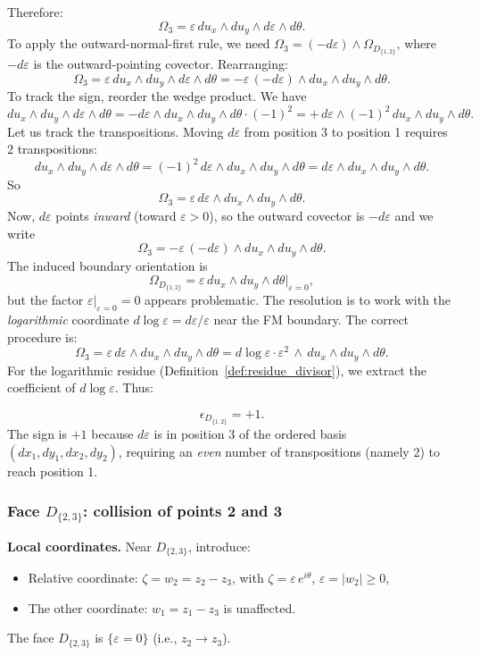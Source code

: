 Therefore:
\[
\Omega_3 = \varepsilon\, du_x\wedge du_y\wedge d\varepsilon\wedge d\theta.
\]
To apply the outward-normal-first rule, we need $\Omega_3 = (-d\varepsilon)\wedge\Omega_{D_{\{1,2\}}}$, where $-d\varepsilon$ is the outward-pointing covector. Rearranging:
\[
\Omega_3 = \varepsilon\,du_x\wedge du_y\wedge d\varepsilon\wedge d\theta = -\varepsilon\,(-d\varepsilon)\wedge du_x\wedge du_y\wedge d\theta.
\]
To track the sign, reorder the wedge product. We have
\[
du_x\wedge du_y\wedge d\varepsilon\wedge d\theta = -d\varepsilon\wedge du_x\wedge du_y\wedge d\theta \cdot (-1)^2 = +\,d\varepsilon\wedge (-1)^2\, du_x\wedge du_y\wedge d\theta.
\]
Let us track the transpositions. Moving $d\varepsilon$ from position 3 to position 1 requires 2 transpositions:
\[
du_x\wedge du_y \wedge d\varepsilon\wedge d\theta = (-1)^2\,d\varepsilon\wedge du_x\wedge du_y\wedge d\theta = d\varepsilon\wedge du_x\wedge du_y\wedge d\theta.
\]
So
\[
\Omega_3 = \varepsilon\,d\varepsilon\wedge du_x\wedge du_y\wedge d\theta.
\]
Now, $d\varepsilon$ points \emph{inward} (toward $\varepsilon > 0$), so the outward covector is $-d\varepsilon$ and we write
\[
\Omega_3 = -\varepsilon\,(-d\varepsilon)\wedge du_x\wedge du_y\wedge d\theta.
\]
The induced boundary orientation is
\[
\Omega_{D_{\{1,2\}}} = \varepsilon\,du_x\wedge du_y\wedge d\theta\Big|_{\varepsilon=0},
\]
but the factor $\varepsilon|_{\varepsilon=0} = 0$ appears problematic. The resolution is to work with the \emph{logarithmic} coordinate $d\log\varepsilon = d\varepsilon/\varepsilon$ near the FM boundary. The correct procedure is:
\[
\Omega_3 = \varepsilon\,d\varepsilon\wedge du_x\wedge du_y\wedge d\theta = d\log\varepsilon \cdot \varepsilon^2\, \wedge\, du_x\wedge du_y\wedge d\theta.
\]
For the logarithmic residue (Definition~\ref{def:residue_divisor}), we extract the coefficient of $d\log\varepsilon$. Thus:

\begin{equation}
\label{eq:eps-D12}
\boxed{\epsilon_{D_{\{1,2\}}} = +1.}
\end{equation}
The sign is $+1$ because $d\varepsilon$ is in position 3 of the ordered basis $(dx_1,dy_1,dx_2,dy_2)$, requiring an \emph{even} number of transpositions (namely 2) to reach position 1.

\subsubsection{Face $D_{\{2,3\}}$: collision of points 2 and 3}

\textbf{Local coordinates.} Near $D_{\{2,3\}}$, introduce:
\begin{itemize}
\item Relative coordinate: $\zeta = w_2 = z_2 - z_3$, with $\zeta = \varepsilon\,e^{i\theta}$, $\varepsilon = |w_2| \ge 0$,
\item The other coordinate: $w_1 = z_1 - z_3$ is unaffected.
\end{itemize}
The face $D_{\{2,3\}}$ is $\{\varepsilon = 0\}$ (i.e., $z_2 \to z_3$).

